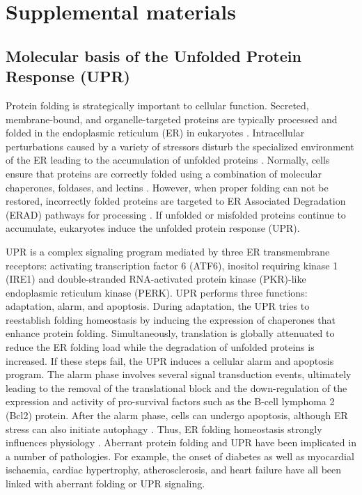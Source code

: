 \documentclass[fleqn,10pt]{wlscirep}
\begin{document}
\section*{Supplemental materials}
\subsection*{Molecular basis of the Unfolded Protein Response (UPR)}
Protein folding is strategically important to cellular function. Secreted, membrane-bound, and organelle-targeted proteins are typically processed and folded in the endoplasmic reticulum (ER) in eukaryotes \cite{naidoo2009er,ron2002translational,kaufman2002unfolded}.
Intracellular perturbations caused by a variety of stressors disturb the specialized environment of the ER leading to the accumulation of unfolded proteins \cite{ellgaard2003qce,Fonseca:2009fk}.
Normally, cells ensure that proteins are correctly folded using a combination of molecular chaperones, foldases, and lectins \cite{naidoo2009er}.
However, when proper folding can not be restored, incorrectly folded proteins are targeted to ER Associated Degradation (ERAD) pathways for processing \cite{kaufman2002unfolded}.
If unfolded or misfolded proteins continue to accumulate, eukaryotes induce the unfolded protein response (UPR).

UPR is a complex signaling program mediated by three ER transmembrane receptors: activating transcription factor 6 (ATF6), inositol requiring kinase 1 (IRE1) and double-stranded RNA-activated protein kinase (PKR)-like endoplasmic reticulum kinase (PERK).
UPR performs three functions: adaptation, alarm, and apoptosis.
During adaptation, the UPR tries to reestablish folding homeostasis by inducing the expression of chaperones that enhance protein folding.
Simultaneously, translation is globally attenuated to reduce the ER folding load while the degradation of unfolded proteins is increased.
If these steps fail, the UPR induces a cellular alarm and apoptosis program. The alarm phase involves several signal transduction events, ultimately leading to the removal of the translational block and the down-regulation of the expression and activity of pro-survival factors such as the B-cell lymphoma 2 (Bcl2) protein.
After the alarm phase, cells can undergo apoptosis, although ER stress can also initiate autophagy \cite{ogata2006aac,yorimitsu2006ers,bernales2006ace,kamimoto2006iic,hoyerhansen2007cmc,kouroku2006esp,fujita2007ter}.
Thus, ER folding homeostasis strongly influences physiology \cite{Fonseca:2009fk}. Aberrant protein folding and UPR have been implicated in a number of pathologies. For example, the onset of diabetes \cite{schnell2009model} as well as myocardial ischaemia, cardiac hypertrophy, atherosclerosis, and heart failure \cite{glembotski2007ers} have all been linked with aberrant folding or UPR signaling.
\end{document}
